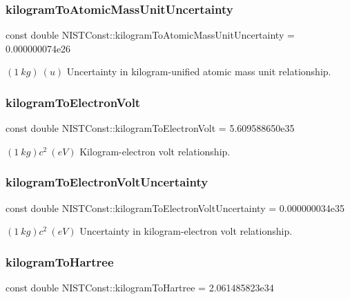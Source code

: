 \subsubsection{\texorpdfstring{kilogram\+To\+Atomic\+Mass\+Unit\+Uncertainty}{kilogramToAtomicMassUnitUncertainty}}
{\footnotesize\ttfamily const double N\+I\+S\+T\+Const\+::kilogram\+To\+Atomic\+Mass\+Unit\+Uncertainty = 0.\+000000074e26}

$(1\ kg)\ (u)$ Uncertainty in kilogram-\/unified atomic mass unit relationship. \mbox{\label{group___n_i_s_t_const-_kilogram_gae0d25d28f6a0596f2dd5f8b3dc5ebb38}} 
\subsubsection{\texorpdfstring{kilogram\+To\+Electron\+Volt}{kilogramToElectronVolt}}
{\footnotesize\ttfamily const double N\+I\+S\+T\+Const\+::kilogram\+To\+Electron\+Volt = 5.\+609588650e35}

$(1\ kg)c^2 \ (eV)$ Kilogram-\/electron volt relationship. \mbox{\label{group___n_i_s_t_const-_kilogram_ga1bc5e8f6c0c532f454e143a589a532dc}} 
\subsubsection{\texorpdfstring{kilogram\+To\+Electron\+Volt\+Uncertainty}{kilogramToElectronVoltUncertainty}}
{\footnotesize\ttfamily const double N\+I\+S\+T\+Const\+::kilogram\+To\+Electron\+Volt\+Uncertainty = 0.\+000000034e35}

$(1\ kg)c^2 \ (eV)$ Uncertainty in kilogram-\/electron volt relationship. \mbox{\label{group___n_i_s_t_const-_kilogram_gaa1f73e0db10cccf2a4c86dbd360e49a8}} 
\subsubsection{\texorpdfstring{kilogram\+To\+Hartree}{kilogramToHartree}}
{\footnotesize\ttfamily const double N\+I\+S\+T\+Const\+::kilogram\+To\+Hartree = 2.\+061485823e34}

